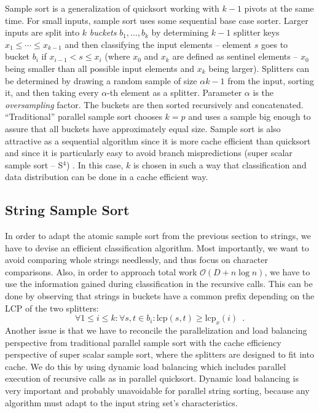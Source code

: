 \documentclass[a4paper]{myjournal}
\newcommand{\gilt}{:}
\newcommand{\Oh}[1]{\mathcal{O}\!\left( #1\right)}
\newcommand{\punkt}{\enspace .}
\newcommand{\lcp}{\mathrm{lcp}}
\def\Oh#1{\mathcal{O}(#1)}
\begin{document}
Sample sort \cite{frazer1970samplesort,blelloch1991comparison} is a generalization of quicksort working
with $k-1$ pivots at the same time.  For small inputs, sample sort uses some
sequential base case sorter.  Larger inputs are split into $k$ \emph{buckets}
$b_1,\ldots,b_k$ by determining $k-1$ splitter keys $x_1\leq \cdots\leq x_{k-1}$
and then classifying the input elements -- element $s$ goes to bucket $b_i$ if
$x_{i-1}< s \leq x_i$ (where $x_0$ and $x_k$ are defined as sentinel elements --
$x_0$ being smaller than all possible input elements and $x_k$ being larger).
Splitters can be determined by drawing a random sample of size $\alpha k-1$ from
the input, sorting it, and then taking every $\alpha$-th element as a
splitter. Parameter $\alpha$ is the \emph{oversampling} factor. The buckets are
then sorted recursively and concatenated. ``Traditional'' parallel sample sort
chooses $k=p$ and uses a sample big enough to assure that all buckets have
approximately equal size.  Sample sort is also attractive as a sequential
algorithm since it is more cache efficient than quicksort and since it is
particularly easy to avoid branch mispredictions (super scalar sample sort --
S$^4$) \cite{sanders2004super}. In this case, $k$ is chosen in such a way that
classification and data distribution can be done in a cache efficient way.

\subsection{String Sample Sort}\label{sec:ss-string}

In order to adapt the atomic sample sort from the previous section to strings,
we have to devise an efficient classification algorithm.  Most importantly, we
want to avoid comparing whole strings needlessly, and thus focus on character
comparisons.  Also, in order to approach total work $\Oh{D+n\log n}$, we have to
use the information gained during classification in the recursive calls. This
can be done by observing that strings in buckets have a common prefix depending
on the LCP of the two splitters:
\begin{equation}\label{eq:lcp}
\forall 1\leq i \leq k\gilt \forall s,t\in b_i\gilt \lcp(s,t)\geq \lcp_x(i)\punkt
\end{equation}
Another issue is that we have to reconcile the parallelization and load
balancing perspective from traditional parallel sample sort with the cache
efficiency perspective of super scalar sample sort, where the splitters are
designed to fit into cache. We do this by using dynamic load balancing which
includes parallel execution of recursive calls as in parallel quicksort. Dynamic
load balancing is very important and probably unavoidable for parallel string
sorting, because any algorithm must adapt to the input string set's
characteristics.
\end{document}
